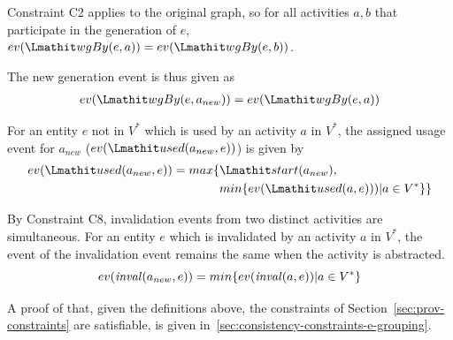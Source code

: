 \begin{definition}
\label{def:abstract-gen-a}
%
Constraint C2 applies to the original graph, so for all activities $a,b$ that participate in the generation of $e$, $ev(\wgby(e,a)) = ev(\wgby(e,b))$. 


The new generation event is thus given as
  \begin{align*}
   ev(\wgby(e,a_{new})) =  ev(\wgby(e,a))
 \end{align*}

\end{definition}

\vspace*{10pt}
\begin{definition} 
\label{def:abstract-usage-a}
For an entity $e$ not in $V^*$ which is used by an activity $a$ in $V^*$, the assigned usage event for $a_{new}$ ($ev(\used(a_{new},e))$) is given by  
\begin{align*}
ev(\used(a_{new},e)) = max\{ & \start(a_{new}) , \\
                            & min\{ev(\used(a,e))) | a \in V^*\}\}
\end{align*}
\end{definition}


\vspace*{10pt}
\begin{definition} 
  \label{def:abstract-inv-a}
  By Constraint C8, invalidation events from two distinct activities are simultaneous.
For an entity $e$ which is invalidated by an activity $a$ in $V^*$, the event of the invalidation event remains the same when the activity is abstracted.
\[
ev(\mathit{inval}(a_{new},e)) = min\{ev(\mathit{inval}(a,e)) | a \in V^*\}
\]
\end{definition}

A proof of that, given the definitions above, the  constraints of Section~\ref{sec:prov-constraints} are satisfiable, is given in~\ref{sec:consistency-constraints-e-grouping}.


